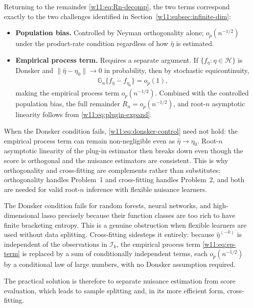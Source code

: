 \documentclass[master.tex]{subfiles}
\begin{document}
Returning to the remainder \eqref{w11:eq:Rn-decomp}, the two terms
correspond exactly to the two challenges identified in
Section~\ref{w11:subsec:infinite-dim}:
\begin{itemize}
  \item \textbf{Population bias.}  Controlled by Neyman
    orthogonality alone; $o_p(n^{-1/2})$ under the product-rate
    condition regardless of how $\hat\eta$ is estimated.
  \item \textbf{Empirical process term.}  Requires a separate
    argument.  If $\{f_\eta : \eta \in \mathcal{H}\}$ is Donsker
    and $\|\hat\eta - \eta_0\| \to 0$ in probability, then by
    stochastic equicontinuity,
    \begin{align}
      \mathbb{G}_n\{f_{\hat\eta} - f_{\eta_0}\} = o_p(1),
      \label{w11:eq:donsker-control}
    \end{align}
    making the empirical process term $o_p(n^{-1/2})$.
    Combined with the controlled population bias, the full
    remainder $R_n = o_p(n^{-1/2})$, and root-$n$ asymptotic
    linearity follows from \eqref{w11:eq:plugin-expand}.
\end{itemize}
When the Donsker condition fails, \eqref{w11:eq:donsker-control}
need not hold: the empirical process term can remain non-negligible
even as $\hat\eta \to \eta_0$.  Root-$n$ asymptotic linearity of
the plug-in estimator then breaks down even though the score is
orthogonal and the nuisance estimators are consistent.  This is why
orthogonality and cross-fitting are complements rather than
substitutes: orthogonality handles Problem~1 and cross-fitting
handles Problem~2, and both are needed for valid root-$n$ inference
with flexible nuisance learners.

\begin{remark}
\label{w11:rem:donsker}
The Donsker condition fails for random forests, neural networks,
and high-dimensional lasso precisely because their function classes
are too rich to have finite bracketing entropy.  This is a genuine
obstruction when flexible learners are used without data splitting.
Cross-fitting sidesteps it entirely: because $\hat\eta^{(-k)}$ is
independent of the observations in $\mathcal{I}_k$, the empirical
process term \eqref{w11:eq:ep-term} is replaced by a sum of
conditionally independent terms, each $o_p(n^{-1/2})$ by a
conditional law of large numbers, with no Donsker assumption
required.
\end{remark}

The practical solution is therefore to separate nuisance estimation
from score evaluation, which leads to sample splitting and, in its
more efficient form, cross-fitting.
\end{document}
